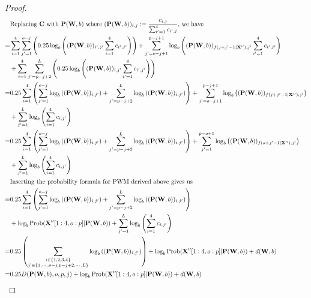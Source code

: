 \documentclass[12pt]{article}
\newcommand{\matrixSymbol}[1]{\mathbf{#1}}
\begin{document}
\begin{proof}
\begin{align}
  & \text{Replacing $\matrixSymbol{C}$ with $\matrixSymbol{P}(\matrixSymbol{W}, b)$ where $ (\matrixSymbol{P}(\matrixSymbol{W}, b))_{i, j}  := \frac{c_{i, j}}{\sum_{i'=1}^{4}{c_{i', j}}} $,  we have} \notag \\
= & \sum_{i=1}^{4}{\sum_{j'=1}^{o - j}{ \left( 0.25 \log_{b}\left( (\matrixSymbol{P}(\matrixSymbol{W}, b))_{i', j'} \sum_{i=1}^{4}{c_{i', j'}}  \right) \right) }  } +  \sum_{j'=o - j + 1}^{p - j + 1}{ \log_{b}\left( (\matrixSymbol{P}(\matrixSymbol{W}, b))_{f(j + j' - 1|\matrixSymbol{X''}), j'} \sum_{i'=1}^{4}{c_{i', j'}} \right) } \notag \\
 & + \sum_{i=1}^{4}{\sum_{j'=p - j + 2}^{L}{ \left(  0.25\log_{b}\left(  (\matrixSymbol{P}(\matrixSymbol{W}, b))_{i, j'} \sum_{i'=1}^{4}{c_{i', j'}}   \right) \right) }  } \\
= & 0.25\sum_{i=1}^{4}{ \left( \sum_{j'=1}^{o - j}{  \log_{b}\left( (\matrixSymbol{P}(\matrixSymbol{W}, b))_{i, j'} \right)   } + \sum_{j'=p-j+2}^{L}{  \log_{b}\left( (\matrixSymbol{P}(\matrixSymbol{W}, b))_{i, j'} \right)   } \right) } + \sum_{j'=o - j + 1}^{p - j + 1}{ \log_{b}\left( (\matrixSymbol{P}(\matrixSymbol{W}, b))_{f(j + j' - 1 |\matrixSymbol{X''}), j'} \right) } \notag\\
 & + \sum_{j'=1}^{L}{\log_{b} \left( \sum_{i=1}^{4}{c_{i, j'}} \right) }  \\
= & 0.25\sum_{i=1}^{4}{ \left( \sum_{j'=1}^{o - j}{  \log_{b}\left( (\matrixSymbol{P}(\matrixSymbol{W}, b))_{i, j'} \right)   } + \sum_{j'=p-j+2}^{L}{  \log_{b}\left( (\matrixSymbol{P}(\matrixSymbol{W}, b))_{i, j'} \right)   } \right) } + \sum_{j'=1}^{p - o + 1}{ \log_{b}\left( (\matrixSymbol{P}(\matrixSymbol{W}, b))_{f(o + j' - 1 |\matrixSymbol{X''}), j'} \right) } \notag\\
 & + \sum_{j'=1}^{L}{\log_{b} \left( \sum_{i=1}^{4}{c_{i, j'}} \right) }  \\
  & \text{Inserting the probability formula for PWM derived above gives us} \notag \\ 
= & 0.25\sum_{i=1}^{4}{ \left( \sum_{j'=1}^{o - j}{  \log_{b}\left( (\matrixSymbol{P}(\matrixSymbol{W}, b))_{i, j'} \right)   } + \sum_{j'=p-j+2}^{L}{  \log_{b}\left( (\matrixSymbol{P}(\matrixSymbol{W}, b))_{i, j'} \right)   } \right) } \notag \\
  & +  \log_{b}{\mathrm{Prob}(\matrixSymbol{X''}[1:4, o:p]|\matrixSymbol{P}(\matrixSymbol{W}, b))} + \sum_{j'=1}^{L}{\log_{b} \left( \sum_{i=1}^{4}{c_{i, j'}} \right) } \\
= & 0.25\left( \sum_{\substack{i \in \{1,2,3,4\} \\ j' \in \{1, \cdots, o-j, p-j+2, \cdots, L\}} }{  \log_{b}\left( (\matrixSymbol{P}(\matrixSymbol{W}, b))_{i, j'} \right) } \right) + \log_{b}{\mathrm{Prob}(\matrixSymbol{X''}[1:4, o:p]|\matrixSymbol{P}(\matrixSymbol{W}, b))} + d(\matrixSymbol{W}, b)  \\
= & 0.25D(\matrixSymbol{P}(\matrixSymbol{W}, b), o, p, j) + \log_{b}{\mathrm{Prob}(\matrixSymbol{X''}[1:4, o:p]|\matrixSymbol{P}(\matrixSymbol{W}, b))} + d(\matrixSymbol{W}, b) 
\end{align}


\end{proof}
\end{document}
